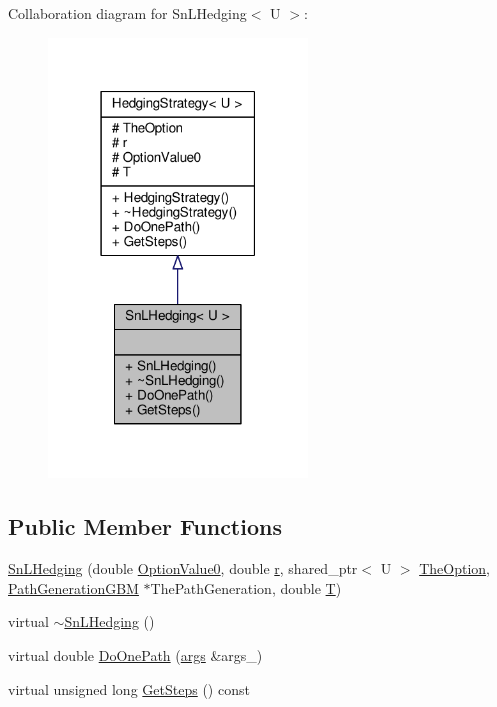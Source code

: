 Collaboration diagram for Sn\+L\+Hedging$<$ U $>$\+:
\nopagebreak
\begin{figure}[H]
\begin{center}
\leavevmode
\includegraphics[width=195pt]{classSnLHedging__coll__graph}
\end{center}
\end{figure}
\subsection*{Public Member Functions}
\begin{DoxyCompactItemize}
\item 
\hyperlink{classSnLHedging_af648095f99d30d5792d96834830a91cf}{Sn\+L\+Hedging} (double \hyperlink{classHedgingStrategy_ac96528e9f4e5a0d1e5aadcc2ebdcab55}{Option\+Value0}, double \hyperlink{classHedgingStrategy_a313da7bc1911dba2a166d2c7bed5f1d7}{r}, shared\+\_\+ptr$<$ U $>$ \hyperlink{classHedgingStrategy_a65699a183423af9d947bb939ae8e907d}{The\+Option}, \hyperlink{classPathGenerationGBM}{Path\+Generation\+G\+BM} $\ast$The\+Path\+Generation, double \hyperlink{classHedgingStrategy_aedb4069f0709b49482a72b9d9c906a5e}{T})
\item 
virtual \hyperlink{classSnLHedging_a89f42282121a44ce30c85de6fd3d4829}{$\sim$\+Sn\+L\+Hedging} ()
\item 
virtual double \hyperlink{classSnLHedging_a6d3f4f5b4e0a56935b9155222a95a76e}{Do\+One\+Path} (\hyperlink{path__generation_8h_a75c13cde2074f502cc4348c70528572d}{args} \&args\+\_\+)
\item 
virtual unsigned long \hyperlink{classSnLHedging_ac44156b45dd20237fc5030877f9b6c66}{Get\+Steps} () const
\end{DoxyCompactItemize}

